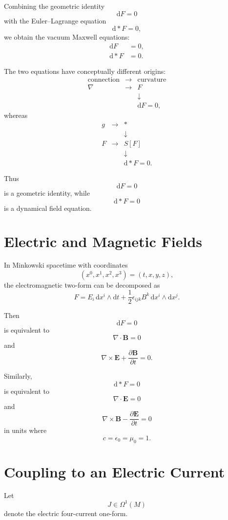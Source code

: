 \documentclass[11pt,a4paper]{article}
\newcommand{\dd}{\mathrm{d}}
\begin{document}
Combining the geometric identity
\[
\dd F=0
\]
with the Euler--Lagrange equation
\[
\dd *F=0,
\]
we obtain the vacuum Maxwell equations:
\[
\boxed{
\begin{aligned}
\dd F &=0,\\
\dd *F&=0.
\end{aligned}
}
\]

The two equations have conceptually different origins:
\[
\begin{array}{ccc}
\text{connection}
&\longrightarrow&
\text{curvature}
\\[4pt]
\nabla
&\longrightarrow&
F
\\[4pt]
&&\downarrow
\\[-2pt]
&&
\dd F=0,
\end{array}
\]
whereas
\[
\begin{array}{ccc}
g
&\longrightarrow&
*
\\[4pt]
&&\downarrow
\\[-2pt]
F
&\longrightarrow&
S[F]
\\[4pt]
&&\downarrow
\\[-2pt]
&&
\dd *F=0.
\end{array}
\]

Thus
\[
\dd F=0
\]
is a geometric identity, while
\[
\dd *F=0
\]
is a dynamical field equation.

\section{Electric and Magnetic Fields}

In Minkowski spacetime with coordinates
\[
(x^0,x^1,x^2,x^3)=(t,x,y,z),
\]
the electromagnetic two-form can be decomposed as
\[
F
=
E_i\,\dd x^i\wedge\dd t
+
\frac12
\epsilon_{ijk}B^k
\,\dd x^i\wedge\dd x^j.
\]

Then
\[
\dd F=0
\]
is equivalent to
\[
\nabla\cdot\mathbf{B}=0
\]
and
\[
\nabla\times\mathbf{E}
+
\frac{\partial\mathbf{B}}{\partial t}
=
0.
\]

Similarly,
\[
\dd *F=0
\]
is equivalent to
\[
\nabla\cdot\mathbf{E}=0
\]
and
\[
\nabla\times\mathbf{B}
-
\frac{\partial\mathbf{E}}{\partial t}
=
0
\]
in units where
\[
c=\epsilon_0=\mu_0=1.
\]

\section{Coupling to an Electric Current}

Let
\[
J\in\Omega^1(M)
\]
denote the electric four-current one-form.
\end{document}
